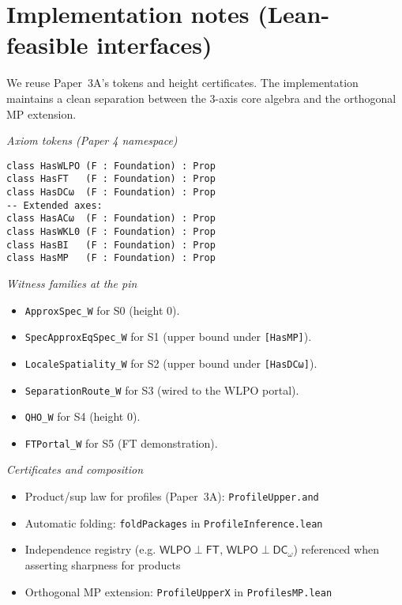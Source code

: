 \documentclass[11pt]{article}
\newcommand{\WLPO}{\mathsf{WLPO}}
\newcommand{\FT}{\mathsf{FT}}
\newcommand{\DCw}{\mathsf{DC}_{\omega}}
\newcommand{\lean}[1]{\texttt{#1}}
\theoremstyle{plain}
\theoremstyle{definition}
\theoremstyle{remark}
\begin{document}
\section{Implementation notes (Lean-feasible interfaces)}

We reuse Paper~3A's tokens and height certificates. The implementation maintains a clean separation between the 3-axis core algebra and the orthogonal MP extension.

\medskip
\noindent\emph{Axiom tokens (Paper 4 namespace)}
\begin{verbatim}
class HasWLPO (F : Foundation) : Prop
class HasFT   (F : Foundation) : Prop
class HasDCω  (F : Foundation) : Prop
-- Extended axes:
class HasACω  (F : Foundation) : Prop
class HasWKL0 (F : Foundation) : Prop
class HasBI   (F : Foundation) : Prop
class HasMP   (F : Foundation) : Prop
\end{verbatim}

\noindent\emph{Witness families at the pin}
\begin{itemize}
  \item \texttt{ApproxSpec\_W} for S0 (height 0).
  \item \texttt{SpecApproxEqSpec\_W} for S1 (upper bound under \texttt{[HasMP]}).
  \item \texttt{LocaleSpatiality\_W} for S2 (upper bound under \texttt{[HasDCω]}).
  \item \texttt{SeparationRoute\_W} for S3 (wired to the WLPO portal).
  \item \texttt{QHO\_W} for S4 (height 0).
  \item \texttt{FTPortal\_W} for S5 (FT demonstration).
\end{itemize}

\noindent\emph{Certificates and composition}
\begin{itemize}
  \item Product/sup law for profiles (Paper~3A): \lean{ProfileUpper.and}
  \item Automatic folding: \lean{foldPackages} in \texttt{ProfileInference.lean}
  \item Independence registry (e.g. $\WLPO\perp \FT$, $\WLPO\perp \DCw$) referenced when asserting sharpness for products
  \item Orthogonal MP extension: \lean{ProfileUpperX} in \texttt{ProfilesMP.lean}
\end{itemize}
\end{document}
